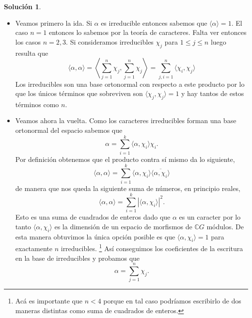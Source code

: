 \documentclass[11pt]{article}
\theoremstyle{plain}
\theoremstyle{definition}
\newtheorem*{sol}{Solución}
\theoremstyle{remark}
\newcommand\CC{\mathbb{C}}
\begin{document}
\begin{sol}
\begin{itemize}
\item Veamos primero la ida. Si $\alpha$ es irreducible entonces sabemos que $\langle \alpha \rangle = 1$. El caso $n=1$ entonces lo sabemos por la teoría de caracteres. Falta ver entonces los casos $n=2,3$. Si consideramos irreducibles $\chi_j$ para $1 \le j \le n$ luego resulta que
\begin{equation*}
\langle \alpha, \alpha \rangle = \left\langle \sum_{j=1}^{n} \chi_j , \sum_{j=1}^{n} \chi_j \right\rangle = \sum_{j,i=1}^n \langle \chi_i, \chi_j \rangle
\end{equation*}	
Los irreducibles son una base ortonormal con respecto a este producto por lo que los únicos términos que sobreviven son $\langle \chi_j, \chi_j \rangle=1$ y hay tantos de estos términos como $n$. 

\item Veamos ahora la vuelta. Como los caracteres irreducibles forman una base ortonormal del espacio sabemos que 
\begin{equation*}
\alpha = \sum_{i=1}^k \langle \alpha, \chi_i \rangle \chi_i.
\end{equation*}
Por definición obtenemos que el producto contra sí mismo da lo siguiente,
\begin{equation*}
\langle \alpha, \alpha \rangle = \sum_{i=1}^{k} \langle \alpha, \chi_i \rangle \overline{\langle \alpha, \chi_i \rangle}
\end{equation*}
de manera que nos queda la siguiente suma de números, en principio reales,
\begin{equation*}
\langle \alpha, \alpha \rangle = \sum_{i=1}^{k} {|\langle \alpha, \chi_i \rangle|^2 }.
\end{equation*}
Esto es una suma de cuadrados de enteros dado que $\alpha$ es un caracter por lo tanto $\langle \alpha, \chi_i \rangle$ es la dimensión de un espacio de morfismos de $\CC G$ módulos. De esta manera obtuvimos la única opción posible es que $\langle \alpha, \chi_i \rangle = 1$ para exactamente $n$ irreducibles. \footnote{Acá es importante que $n < 4$ porque en tal caso podríamos escribirlo de dos maneras distintas como suma de cuadrados de enteros.} Así conseguimos los coeficientes de la escritura en la base de irreducibles y probamos que
\begin{equation*}
\alpha = \sum_{j=1}^n  \chi_j.
\end{equation*}
\end{itemize}	
\end{sol}	
	
\end{document}
